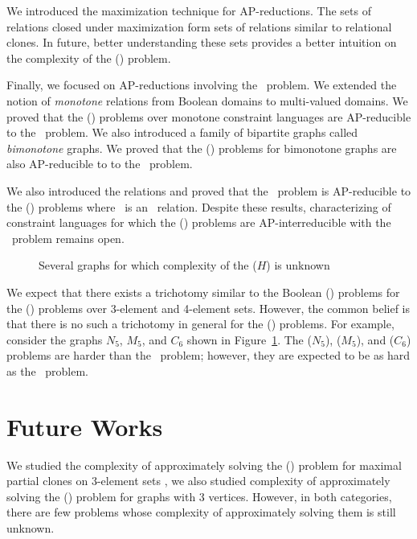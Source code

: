We introduced the maximization technique for AP-reductions. The sets of relations closed
under maximization form sets of relations similar to relational clones.
In future, better understanding these sets provides a better intuition on the complexity of 
the \ccsp(\mrelset) problem.

Finally, we focused on AP-reductions involving the \cbis\ problem.
We extended the notion of \emph{monotone} relations from Boolean domains to 
multi-valued domains. We proved that the \ccsp(\mrelset) problems 
over monotone constraint languages
are AP-reducible to the \cbis\ problem. We also introduced a family of bipartite graphs
called \emph{bimonotone} graphs. We proved that the \chom(\mH) problems 
for bimonotone graphs are also AP-reducible to to the \cbis\ problem.

We also introduced the \emph{\RBA} relations and proved that the \cbis\ problem is
AP-reducible to the \ccsp(\mR) problems where \mR\ is an \RBA\ relation.
Despite these results, characterizing of constraint languages for which 
the \ccsp(\mrelset) problems are AP-interreducible with the \cbis\ problem remains open.

\begin{figure}
\centering
\subfigure[\ensuremath{N_5}]{\label{fig:n5}}\hfill
\subfigure[\ensuremath{M_5}]{\label{fig:m5}}\hfill
\subfigure[\ensuremath{C_6}]{\label{fig:c6}}
\caption{Several graphs for which complexity of the \chom(\ensuremath{H}) is unknown}
\label{fig:unknown}
\end{figure}

We expect that there exists a trichotomy similar to the Boolean \ccsp(\mrelset) problems
for the \ccsp(\mrelset) problems over 3-element and 4-element sets.
However, the common belief is that there is no such a trichotomy in general for
the \ccsp(\mrelset) problems.
For example, consider the graphs \(N_5\), \(M_5\), and \(C_6\) shown in Figure~\ref{fig:unknown}.
The \chom(\(N_5\)), \chom(\(M_5\)), and \chom(\(C_6\)) problems are harder than
the \cbis\ problem; however, they are expected to be as hard as the \csat\ problem.

\section{Future Works}
We studied the complexity of approximately solving 
the \ccsp(\mrelset) problem for maximal partial clones on
3-element sets \cite{mvl}, we also studied complexity of approximately solving 
the \chom(\mH) problem for graphs with 3 vertices. However, in both categories,
there are few problems whose complexity of approximately solving them is still unknown.

